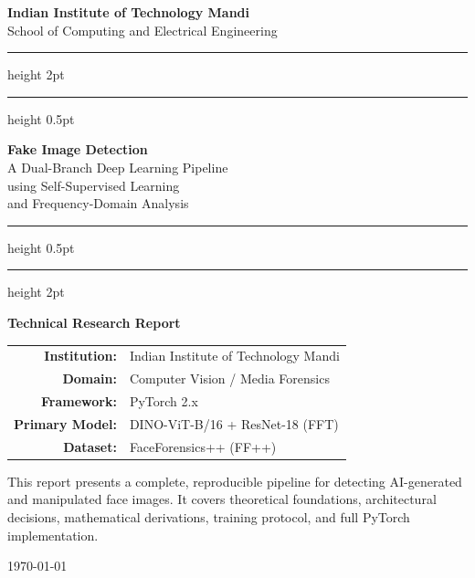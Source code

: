 \documentclass[12pt,a4paper]{article}
\begin{document}
\onehalfspacing

\begin{titlepage}
\centering
\vspace*{1cm}

{\Large\bfseries\color{iitblue} Indian Institute of Technology Mandi\\[0.3em]}
{\large\color{darkgray} School of Computing and Electrical Engineering\\[2em]}

\hrule height 2pt
\vspace{0.4em}
\hrule height 0.5pt
\vspace{1.5em}

{\Huge\bfseries\color{iitblue}
Fake Image Detection\\[0.4em]
}
{\LARGE\color{iitblue!70!black}
A Dual-Branch Deep Learning Pipeline\\[0.3em]
using Self-Supervised Learning\\[0.2em]
and Frequency-Domain Analysis
}

\vspace{1.5em}
\hrule height 0.5pt
\vspace{0.4em}
\hrule height 2pt

\vspace{2em}

\begin{tcolorbox}[colback=boxblue, colframe=iitblue, width=0.85\textwidth]
\centering
\textbf{Technical Research Report}\\[0.5em]
\begin{tabular}{rl}
\textbf{Institution:} & Indian Institute of Technology Mandi \\
\textbf{Domain:} & Computer Vision / Media Forensics \\
\textbf{Framework:} & PyTorch 2.x \\
\textbf{Primary Model:} & DINO-ViT-B/16 + ResNet-18 (FFT) \\
\textbf{Dataset:} & FaceForensics++ (FF++) \\
\end{tabular}
\end{tcolorbox}

\vfill

{\small\color{darkgray}
This report presents a complete, reproducible pipeline for detecting AI-generated and
manipulated face images. It covers theoretical foundations, architectural decisions,
mathematical derivations, training protocol, and full PyTorch implementation.
}

\vspace{1em}
{\small\color{iitblue}\today}
\end{titlepage}
\end{document}
